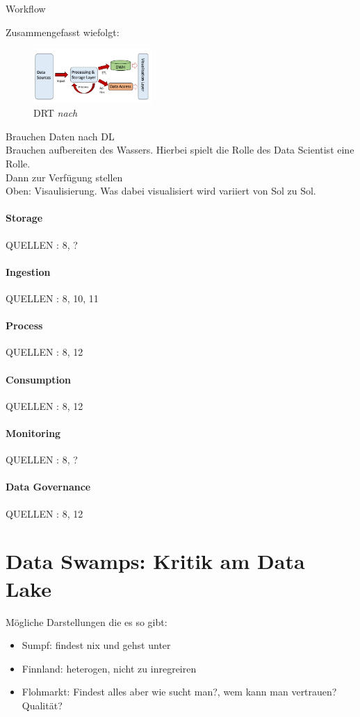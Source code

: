 \documentclass[twoside,twocolumn]{article}
\begin{document}
Workflow

Zusammengefasst wiefolgt:

\begin{figure}[h]
	\centering 
	\includegraphics[width=0.4\textwidth]{img/p4} 
	\caption[DRT]{DRT \textit{nach} \cite{src9}}	
\end{figure}


Brauchen Daten nach DL\\
Brauchen aufbereiten des Wassers. Hierbei spielt die Rolle des Data Scientist eine Rolle.\cite{src8}\\
Dann zur Verfügung stellen\\
Oben: Visaulisierung. Was dabei visualisiert wird variiert von Sol zu Sol.


\paragraph{Storage}
QUELLEN : 8, ?
\paragraph{Ingestion}
QUELLEN : 8, 10, 11
\paragraph{Process}
QUELLEN : 8, 12
\paragraph{Consumption}
QUELLEN : 8, 12
\paragraph{Monitoring}
QUELLEN : 8, ?
\paragraph{Data Governance}
QUELLEN : 8, 12


\section{Data Swamps: Kritik am Data Lake}
Mögliche Darstellungen die es so gibt:
\begin{itemize}
	\item Sumpf: findest nix und gehst unter \cite{src3}
	\item Finnland: heterogen, nicht zu inregreiren \cite{src13}
	\item Flohmarkt: Findest alles aber wie sucht man?, wem kann man vertrauen? Qualität? \cite{src12}
\end{itemize}
\end{document}

